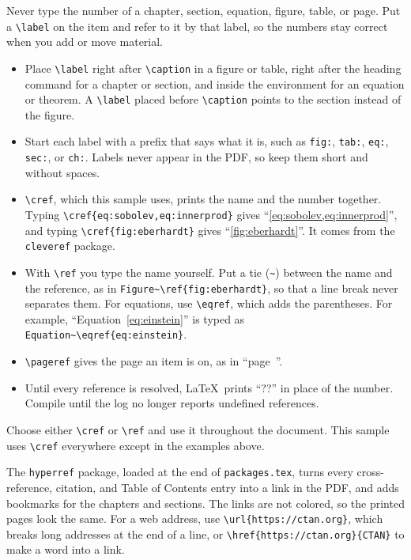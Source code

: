 Never type the number of a chapter, section, equation, figure, table, or page. Put a \verb+\label+ on the item and refer to it by that label, so the numbers stay correct when you add or move material.
\begin{itemize}
\item Place \verb+\label+ right after \verb+\caption+ in a figure or table, right after the heading command for a chapter or section, and inside the environment for an equation or theorem. A \verb+\label+ placed before \verb+\caption+ points to the section instead of the figure.
\item Start each label with a prefix that says what it is, such as \texttt{fig:}, \texttt{tab:}, \texttt{eq:}, \texttt{sec:}, or \texttt{ch:}. Labels never appear in the PDF, so keep them short and without spaces.
\item \verb+\cref+, which this sample uses, prints the name and the number together. Typing \verb+\cref{eq:sobolev,eq:innerprod}+ gives ``\cref{eq:sobolev,eq:innerprod}'', and typing \verb+\cref{fig:eberhardt}+ gives ``\cref{fig:eberhardt}''. It comes from the \texttt{cleveref} package.
\item With \verb+\ref+ you type the name yourself. Put a tie (\verb+~+) between the name and the reference, as in \verb+Figure~\ref{fig:eberhardt}+, so that a line break never separates them. For equations, use \verb+\eqref+, which adds the parentheses. For example, ``Equation~\eqref{eq:einstein}'' is typed as \verb+Equation~\eqref{eq:einstein}+.
\item \verb+\pageref+ gives the page an item is on, as in ``page~\pageref{fig:eberhardt}''.
\item Until every reference is resolved, \LaTeX\ prints ``??'' in place of the number. Compile until the log no longer reports undefined references.
\end{itemize}
Choose either \verb+\cref+ or \verb+\ref+ and use it throughout the document. This sample uses \verb+\cref+ everywhere except in the examples above.

The \texttt{hyperref} package, loaded at the end of \texttt{packages.tex}, turns every cross-reference, citation, and Table of Contents entry into a link in the PDF, and adds bookmarks for the chapters and sections. The links are not colored, so the printed pages look the same. For a web address, use \verb+\url{https://ctan.org}+, which breaks long addresses at the end of a line, or \verb+\href{https://ctan.org}{CTAN}+ to make a word into a link.


